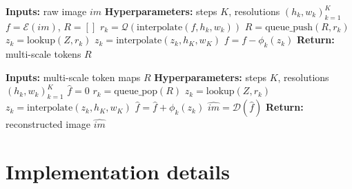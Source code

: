 \begin{center}
\begin{minipage}[t]{0.5\linewidth}
  \centering
  \scalebox{0.86}
  {
  \begin{algorithm}[H]
    \caption{\small{~Multi-scale VQVAE Encoding}} \label{alg:enc}
    \small{
    \textbf{Inputs: } raw image $im$\;
    \textbf{Hyperparameters: } steps $K$, resolutions $(h_k,w_k)_{k=1}^{K}$\;
    $f = \mathcal{E}(im)$, $R=[]$\;
    {
    $r_k = \mathcal{Q}(\text{interpolate}(f, h_k, w_k))$\;
    $R = \text{queue\_push}(R, r_k)$\;
    $z_k = \text{lookup}(Z, r_k)$\;
    $z_k = \text{interpolate}(z_k, h_K, w_K)$\;
    $f = f - \phi_k(z_k)$\;
    }
    \textbf{Return: } multi-scale tokens $R$\;
    }
  \end{algorithm}
  }
\end{minipage}%
\begin{minipage}[t]{0.5\linewidth}
  \centering
  \scalebox{0.81}
  {
  \begin{algorithm}[H]
    \caption{\small{~Multi-scale VQVAE Reconstruction}} \label{alg:dec}
    \small{
    \textbf{Inputs: } multi-scale token maps $R$\;
    \textbf{Hyperparameters: } steps $K$, resolutions $(h_k,w_k)_{k=1}^{K}$\;
    $\hat{f} = 0 $\;
    {
    $r_k = \text{queue\_pop}(R)$\;
    $z_k = \text{lookup}(Z, r_k)$\;
    $z_k = \text{interpolate}(z_k, h_K, w_K)$\;
    $\hat{f} = \hat{f} + \phi_k(z_k)$\;
    }
    $\hat{im} = \mathcal{D}(\hat{f}) $\;
    \textbf{Return: } reconstructed image $\hat{im}$\;
    }
  \end{algorithm}
  }
\end{minipage}
\end{center}



\section{Implementation details} \label{sec:impl}

